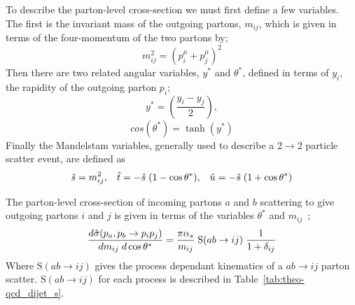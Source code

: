 To describe the parton-level cross-section we must first define a few variables.
The first is the invariant mass of the outgoing partons, $m_{ij}$, which is given in terms of the four-momentum of the two partons by;
\begin{equation}
  m_{ij}^2 = (p^\mu_i + p^\mu_j)^2  
\end{equation}
\noindent
Then there are two related angular variables, $y^*$ and $\theta^*$,
defined in terms of $y_i$, the rapidity of the outgoing parton $p_i$;
\begin{equation}
  y^* = (\frac{y_i - y_j}{2}),
\end{equation}
\begin{equation}
  cos(\theta^*) = \tanh(y^*)
\end{equation}
\noindent
Finally the Mandelstam variables, generally used to describe a 2$\to$2 particle scatter event, are defined as 
\begin{equation}
  \hat{s} = m_{ij}^2, \hspace{3mm}  \hat{t} = -\hat{s}\hspace{1mm}(1 - \cos{\theta^*}), \hspace{3mm} \hat{u} = - \hat{s}\hspace{1mm}(1+\cos{\theta^*})
\end{equation}

\noindent
The parton-level cross-section of incoming partons $a$ and $b$ scattering to give
outgoing partons $i$ and $j$ is given in terms of the variables $\theta^*$ and $m_{ij}$~\cite{theo-dijet_harris};
\begin{equation}
  \frac{d\hat{\sigma}(p_a, p_b \to p_i p_j)}{dm_{ij}\hspace{1mm}d\cos{\theta^*}} = \frac{ \pi \alpha_s}{m_{ij}}\hspace{1mm} \text{S}(ab \to ij) \hspace{1mm} \frac{1}{1+\delta_{ij}}
  \label{eq:theo-qcd_dijet_xs}
\end{equation}
Where $\text{S}(ab \to ij)$ gives the process dependant kinematics of a $ab \to ij$  parton scatter.
$\text{S}(ab \to ij)$ for each process is described in Table~\ref{tab:theo-qcd_dijet_s}.

%    
%

